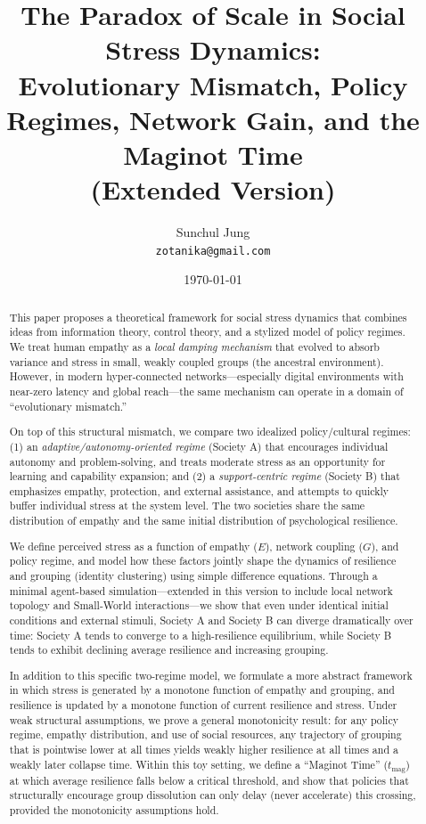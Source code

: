 \documentclass[11pt]{article}
\title{The Paradox of Scale in Social Stress Dynamics:\\
Evolutionary Mismatch, Policy Regimes, Network Gain, and the Maginot Time\\
\large (Extended Version)}
\author{Sunchul Jung\\[4pt]
\small \texttt{zotanika@gmail.com}
}
\date{\today}
\theoremstyle{plain}
\begin{document}
\maketitle

\begin{abstract}
This paper proposes a theoretical framework for social stress dynamics that combines ideas from information theory, control theory, and a stylized model of policy regimes.
We treat human empathy as a \emph{local damping mechanism} that evolved to absorb variance and stress in small, weakly coupled groups (the ancestral environment).
However, in modern hyper-connected networks---especially digital environments with near-zero latency and global reach---the same mechanism can operate in a domain of ``evolutionary mismatch.''

On top of this structural mismatch, we compare two idealized policy/cultural regimes:
(1) an \emph{adaptive/autonomy-oriented regime} (Society A) that encourages individual autonomy and problem-solving, and treats moderate stress as an opportunity for learning and capability expansion; and
(2) a \emph{support-centric regime} (Society B) that emphasizes empathy, protection, and external assistance, and attempts to quickly buffer individual stress at the system level.
The two societies share the same distribution of empathy and the same initial distribution of psychological resilience.

We define perceived stress as a function of empathy ($E$), network coupling ($G$), and policy regime, and model how these factors jointly shape the dynamics of resilience and grouping (identity clustering) using simple difference equations.
Through a minimal agent-based simulation---extended in this version to include local network topology and Small-World interactions---we show that even under identical initial conditions and external stimuli, Society A and Society B can diverge dramatically over time:
Society A tends to converge to a high-resilience equilibrium, while Society B tends to exhibit declining average resilience and increasing grouping.

In addition to this specific two-regime model, we formulate a more abstract framework in which stress is generated by a monotone function of empathy and grouping, and resilience is updated by a monotone function of current resilience and stress.
Under weak structural assumptions, we prove a general monotonicity result: for any policy regime, empathy distribution, and use of social resources, any trajectory of grouping that is pointwise lower at all times yields weakly higher resilience at all times and a weakly later collapse time.
Within this toy setting, we define a ``Maginot Time'' ($t_{\text{mag}}$) at which average resilience falls below a critical threshold, and show that policies that structurally encourage group dissolution can only delay (never accelerate) this crossing, provided the monotonicity assumptions hold.


\end{abstract}
\end{document}
